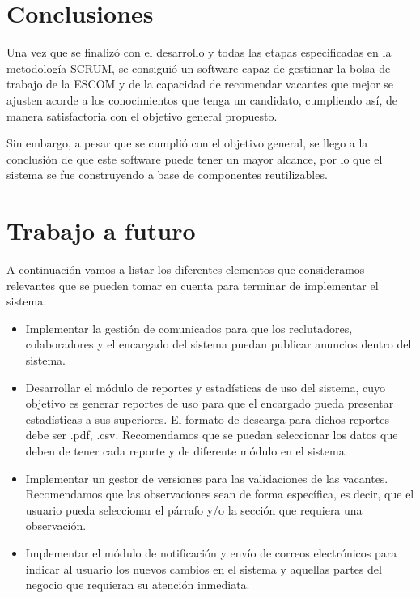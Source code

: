 \clearpage
\section{Conclusiones}
Una vez que se finalizó con el desarrollo y todas las etapas especificadas en la metodología SCRUM, se consiguió un software capaz de gestionar la bolsa de trabajo de la ESCOM y de la capacidad de recomendar vacantes que mejor se ajusten acorde a los conocimientos que tenga un candidato, cumpliendo así, de manera satisfactoria con el objetivo general propuesto.

Sin embargo, a pesar que se cumplió con el objetivo general, se llego a la conclusión de que este software puede tener un mayor alcance, por lo que el sistema se fue construyendo a base de componentes reutilizables.




\section{Trabajo a futuro} 
A continuación vamos a listar los diferentes elementos que consideramos relevantes que se pueden tomar en cuenta para terminar de implementar el sistema.
\begin{itemize}
	\item Implementar la gestión de comunicados para que los reclutadores, colaboradores y el encargado del sistema puedan publicar anuncios dentro del sistema.
	\item Desarrollar el módulo de reportes y estadísticas de uso del sistema, cuyo objetivo es generar reportes de uso para que el encargado pueda presentar estadísticas  a sus superiores. El formato de descarga para dichos reportes debe ser .pdf, .csv. Recomendamos que se puedan seleccionar los datos que deben de tener cada reporte y de diferente módulo en el sistema.
	\item Implementar un gestor de versiones para las validaciones de las vacantes. Recomendamos que las observaciones sean de forma específica, es decir, que el usuario pueda seleccionar el párrafo y/o la sección que requiera una observación.
	\item Implementar el módulo de notificación y envío de correos electrónicos para indicar al usuario los nuevos cambios en el sistema y aquellas partes del negocio que requieran su atención inmediata. 
\end{itemize}

